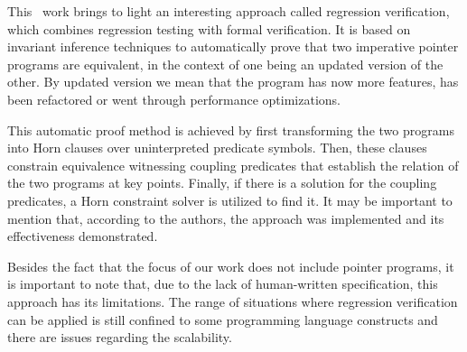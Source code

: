 This~\cite{DBLP:journals/fmsd/KlebanovRU18} work brings to light an interesting approach called regression verification, which combines regression testing with formal verification.
It is based on invariant inference techniques to automatically prove that two imperative pointer programs are equivalent, in the context of one being an updated version of the other.
By updated version we mean that the program has now more features, has been refactored or went through performance optimizations.

This automatic proof method is achieved by first transforming the two programs into Horn clauses over uninterpreted predicate symbols. 
Then, these clauses constrain equivalence witnessing coupling predicates that establish the relation of the two programs at key points.
Finally, if there is a solution for the coupling predicates, a Horn constraint solver is utilized to find it.
It may be important to mention that, according to the authors, the approach was implemented and its effectiveness demonstrated.

Besides the fact that the focus of our work does not include pointer programs, it is important to note that, due to the lack of human-written specification, this approach has its limitations.
The range of situations where regression verification can be applied is still confined to some programming language constructs and there are issues regarding the scalability.
\fi
